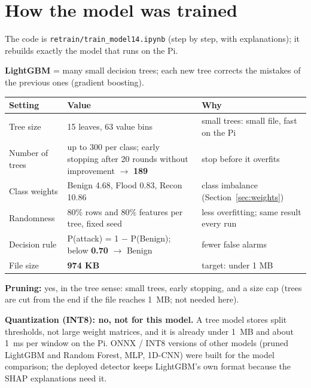 \documentclass[11pt,a4paper]{article}
\newcommand{\file}[1]{\texttt{\small #1}}
\newcommand{\tablestart}{\Needspace{8\baselineskip}}
\begin{document}
\section{How the model was trained}

The code is \file{retrain/train\_model14.ipynb} (step by step, with explanations); it rebuilds exactly the model
that runs on the Pi.

\textbf{LightGBM} = many small decision trees; each new tree corrects the mistakes of the previous ones
(gradient boosting).

\tablestart
\begin{center}
\begin{tabularx}{\linewidth}{P{3.4cm}P{4.6cm}L}
\toprule
Setting & Value & Why \\
\midrule
Tree size & 15 leaves, 63 value bins & small trees: small file, fast on the Pi \\
Number of trees & up to 300 per class; early stopping after 20 rounds without improvement $\rightarrow$
\textbf{189} & stop before it overfits \\
Class weights & Benign 4.68, Flood 0.83, Recon 10.86 & class imbalance (Section~\ref{sec:weights}) \\
Randomness & 80\% rows and 80\% features per tree, fixed seed & less overfitting; same result every run \\
Decision rule & P(attack) = 1 $-$ P(Benign); below \textbf{0.70} $\rightarrow$ Benign & fewer false alarms \\
File size & \textbf{974 KB} & target: under 1 MB \\
\bottomrule
\end{tabularx}
\end{center}

\textbf{Pruning:} yes, in the tree sense: small trees, early stopping, and a size cap (trees are cut from the end if
the file reaches 1~MB; not needed here).

\textbf{Quantization (INT8): no, not for this model.} A tree model stores split thresholds, not large weight
matrices, and it is already under 1~MB and about 1~ms per window on the Pi. ONNX / INT8 versions of other models
(pruned LightGBM and Random Forest, MLP, 1D-CNN) were built for the model comparison; the deployed detector keeps
LightGBM's own format because the SHAP explanations need it.

\end{document}
